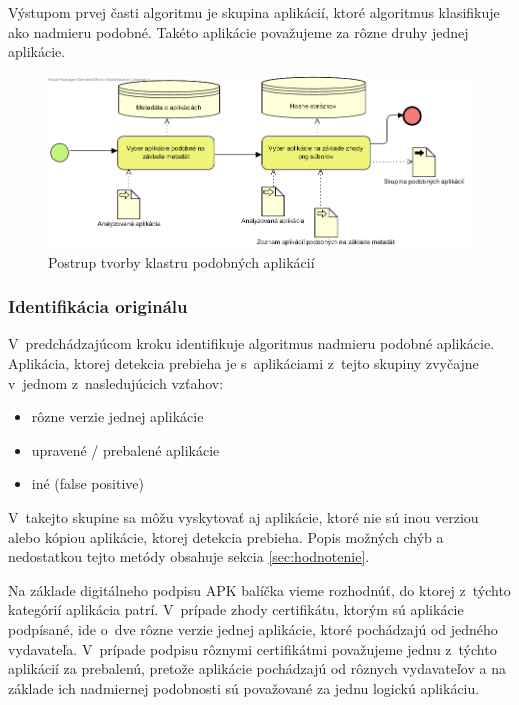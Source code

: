 Výstupom prvej časti algoritmu je skupina aplikácií, ktoré algoritmus klasifikuje ako nadmieru podobné. Takéto aplikácie považujeme za rôzne druhy jednej aplikácie.

\begin{figure}[htb]
  \begin{center}
    \includegraphics[width=130mm]{images/detection-cluster.png}
  \end{center}
  \caption{Postrup tvorby klastru podobných aplikácií}
  \label{fig:detectionClustering}
\end{figure}
\subsubsection{\textbf{Identifikácia originálu}} 
V~predchádzajúcom kroku identifikuje algoritmus nadmieru podobné aplikácie. Aplikácia, ktorej detekcia prebieha je s~aplikáciami z~tejto skupiny zvyčajne v~jednom z~nasledujúcich vzťahov:
\begin{itemize}
	\item rôzne verzie jednej aplikácie
	\item upravené / prebalené aplikácie
	\item iné (false positive)
\end{itemize}
V~takejto skupine sa môžu vyskytovať aj aplikácie, ktoré nie sú inou verziou alebo kópiou aplikácie, ktorej detekcia prebieha. Popis možných chýb a nedostatkou tejto metódy obsahuje sekcia \ref{sec:hodnotenie}.

Na základe digitálneho podpisu APK balíčka vieme rozhodnúť, do ktorej z~týchto kategórií aplikácia patrí. V~prípade zhody certifikátu, ktorým sú aplikácie podpísané, ide o~dve rôzne verzie jednej aplikácie, ktoré pochádzajú od jedného vydavateľa. V~prípade podpisu rôznymi certifikátmi považujeme jednu z~týchto aplikácií za prebalenú, pretože aplikácie pochádzajú od rôznych vydavateľov a na základe ich nadmiernej podobnosti sú považované za jednu logickú aplikáciu.

